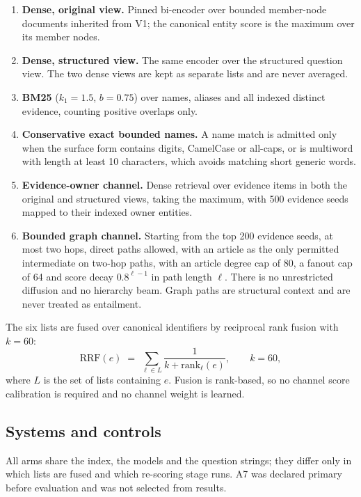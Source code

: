 \documentclass[11pt,a4paper]{article}
\begin{document}
\begin{enumerate}
\item \textbf{Dense, original view.} Pinned bi-encoder over bounded member-node documents inherited from V1; the canonical entity score is the maximum over its member nodes.
\item \textbf{Dense, structured view.} The same encoder over the structured question view. The two dense views are kept as separate lists and are never averaged.
\item \textbf{BM25} ($k_1=1.5$, $b=0.75$) over names, aliases and all indexed distinct evidence, counting positive overlaps only.
\item \textbf{Conservative exact bounded names.} A name match is admitted only when the surface form contains digits, CamelCase or all-caps, or is multiword with length at least 10 characters, which avoids matching short generic words.
\item \textbf{Evidence-owner channel.} Dense retrieval over evidence items in both the original and structured views, taking the maximum, with 500 evidence seeds mapped to their indexed owner entities.
\item \textbf{Bounded graph channel.} Starting from the top 200 evidence seeds, at most two hops, direct paths allowed, with an article as the only permitted intermediate on two-hop paths, with an article degree cap of 80, a fanout cap of 64 and score decay $0.8^{\ell-1}$ in path length $\ell$. There is no unrestricted diffusion and no hierarchy beam. Graph paths are structural context and are never treated as entailment.
\end{enumerate}

The six lists are fused over canonical identifiers by reciprocal rank fusion with $k=60$:
\begin{equation}
\mathrm{RRF}(e) \;=\; \sum_{\ell \in L} \frac{1}{k + \mathrm{rank}_{\ell}(e)}, \qquad k = 60 ,
\end{equation}
where $L$ is the set of lists containing $e$. Fusion is rank-based, so no channel score calibration is required and no channel weight is learned.

\subsection{Systems and controls}
\label{sec:arms}

All arms share the index, the models and the question strings; they differ only in which lists are fused and which re-scoring stage runs. A7 was declared primary before evaluation and was not selected from results.
\end{document}

